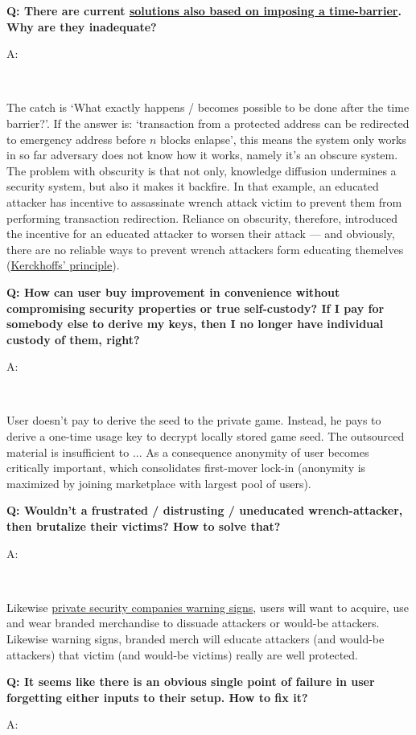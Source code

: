 \documentclass[12pt,a4paper]{article}
\newenvironment{question}[1]{%
  \vspace{0.8em}\noindent\textbf{Q: #1}\par
  \vspace{0.2em}\noindent\begin{itshape}A:\end{itshape}~%
}{\vspace{0.8em}}
\newcommand{\privsecplaque}{https://duckduckgo.com/?q=prosegur+verisure+\%22warning+sign\%22+facade\&iar=images\&t=brave\&iaf=type\%3Aphoto}
\begin{document}
\begin{question}{There are current \href{https://rewindbitcoin.com/}{solutions also based on imposing a time-barrier}. Why are they inadequate?}
The catch is `What exactly happens / becomes possible to be done after the time barrier?'. If the answer is: `transaction from a protected address can be redirected to emergency address before $n$ blocks enlapse', this means the system only works in so far adversary does not know how it works, namely it's an obscure system. The problem with obscurity is that not only, knowledge diffusion undermines a security system, but also it makes it backfire. In that example, an educated attacker has incentive to assassinate wrench attack victim to prevent them from performing transaction redirection. Reliance on obscurity, therefore, introduced the incentive for an educated attacker to worsen their attack --- and obviously, there are no reliable ways to prevent wrench attackers form educating themelves (\href{kprinciple}{Kerckhoffs' principle}).
\end{question}

\begin{question}{How can user buy improvement in convenience without compromising security properties or true self-custody? If I pay for somebody else to derive my keys, then I no longer have individual custody of them, right?}
User doesn't pay to derive the seed to the private game. Instead, he pays to derive a one-time usage key to decrypt locally stored game seed. The outsourced material is insufficient to 
...
As a consequence anonymity of user becomes critically important, which consolidates first-mover lock-in (anonymity is maximized by joining marketplace with largest pool of users).
\end{question}

\begin{question}{Wouldn't a frustrated / distrusting / uneducated wrench-attacker, then brutalize their victims? How to solve that?}
Likewise \href{\privsecplaque}{private security companies warning signs}, users will want to acquire, use and wear branded merchandise to dissuade attackers or would-be attackers. Likewise warning signs, branded merch will educate attackers (and would-be attackers) that victim (and would-be victims) really are well protected.
\end{question}

\begin{question}{It seems like there is an obvious single point of failure in user forgetting either inputs to their setup. How to fix it?}
\end{question}
\end{document}
